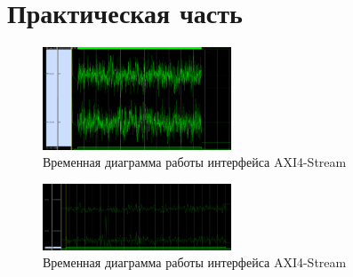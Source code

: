 \section{Практическая часть}

\begin{figure}[h]
	\centering
	\includegraphics[width=0.5\textwidth]{image/lfm_with_noise.png}
	\caption{Временная диаграмма работы интерфейса AXI4-Stream}
	\label{fft_result}
\end{figure}
	
\begin{figure}[h]
	\centering
	\includegraphics[width=0.5\textwidth]{image/correl_with_noise.png}
	\caption{Временная диаграмма работы интерфейса AXI4-Stream}
	\label{fft_detailed_implem}
\end{figure}